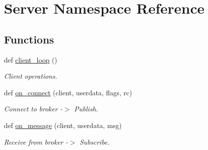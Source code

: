 \hypertarget{namespace_server}{}\section{Server Namespace Reference}
\label{namespace_server}
\subsection*{Functions}
\begin{DoxyCompactItemize}
\item 
def \mbox{\hyperlink{namespace_server_a3263614659e29ecc64917e05f7a0fc23}{client\+\_\+loop}} ()
\begin{DoxyCompactList}\small\item\em Client operations. \end{DoxyCompactList}\item 
def \mbox{\hyperlink{namespace_server_afb7ecc984e3ec5dd71085afb8bf0ca8d}{on\+\_\+connect}} (client, userdata, flags, rc)
\begin{DoxyCompactList}\small\item\em Connect to broker -\/$>$ Publish. \end{DoxyCompactList}\item 
def \mbox{\hyperlink{namespace_server_a7cd4ed12467e0918d4e7f73e7982e222}{on\+\_\+message}} (client, userdata, msg)
\begin{DoxyCompactList}\small\item\em Receive from broker -\/$>$ Subscribe. \end{DoxyCompactList}\end{DoxyCompactItemize}
